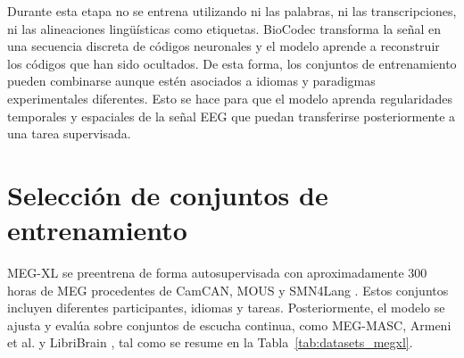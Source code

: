 Durante esta etapa no se entrena utilizando ni las palabras, ni las transcripciones, ni las alineaciones lingüísticas como etiquetas. BioCodec transforma la señal en una secuencia discreta de códigos neuronales y el modelo aprende a reconstruir los códigos que han sido ocultados. De esta forma, los conjuntos de entrenamiento pueden combinarse aunque estén asociados a idiomas y paradigmas experimentales diferentes. Esto se hace para que el modelo aprenda regularidades temporales y espaciales de la señal EEG que puedan transferirse posteriormente a una tarea supervisada.


\section{Selección de conjuntos de entrenamiento}

MEG-XL se preentrena de forma autosupervisada con aproximadamente 300 horas de MEG procedentes de CamCAN, MOUS y SMN4Lang \cite{jayalath2026megxl}. Estos conjuntos incluyen diferentes participantes, idiomas y tareas. Posteriormente, el modelo se ajusta y evalúa sobre conjuntos de escucha continua, como MEG-MASC, Armeni et al. y LibriBrain \cite{gwilliams2023megmasc,armeni2022meg,ozdogan2025libribrain}, tal como se resume en la Tabla~\ref{tab:datasets_megxl}.

